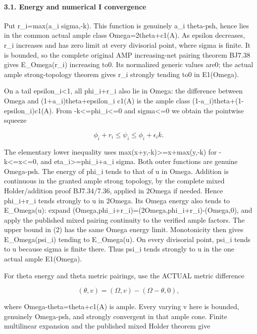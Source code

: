 \documentclass[
]{article}
\begin{document}
\paragraph{3.1. Energy and numerical I
convergence}\label{energy-and-numerical-i-convergence}

Put r\_i=max(a\_i sigma,-k). This function is genuinely a\_i theta-psh,
hence lies in the common actual ample class Omega=2theta+c1(A). As
epsilon decreases, r\_i increases and has zero limit at every divisorial
point, where sigma is finite. It is bounded, so the complete original
AMP increasing-net pairing theorem BJ7.38 gives E\_Omega(r\_i)
increasing to0. Its normalized generic values are0; the actual ample
strong-topology theorem gives r\_i strongly tending to0 in E1(Omega).

On a tail epsilon\_i\textless1, all phi\_i+r\_i also lie in Omega: the
difference between Omega and (1+a\_i)theta+epsilon\_i c1(A) is the ample
class (1-a\_i)theta+(1-epsilon\_i)c1(A). From
-k\textless=phi\_i\textless=0 and sigma\textless=0 we obtain the
pointwise squeeze

\[\phi_i+r_i\leq\psi_i\leq\phi_i+\epsilon_i k.\tag{2}\]

The elementary lower inequality uses max(x+y,-k)\textgreater=x+max(y,-k)
for -k\textless=x\textless=0, and eta\_i\textgreater=phi\_i+a\_i sigma.
Both outer functions are genuine Omega-psh. The energy of phi\_i tends
to that of u in Omega. Addition is continuous in the granted ample
strong topology, by the complete mixed Holder/addition proof
BJ7.34/7.36, applied in 2Omega if needed. Hence phi\_i+r\_i tends
strongly to u in 2Omega. Its Omega energy also tends to E\_Omega(u):
expand (Omega,phi\_i+r\_i)=(2Omega,phi\_i+r\_i)-(Omega,0), and apply the
published mixed pairing continuity to the verified ample factors. The
upper bound in (2) has the same Omega energy limit. Monotonicity then
gives E\_Omega(psi\_i) tending to E\_Omega(u). On every divisorial
point, psi\_i tends to u because sigma is finite there. Thus psi\_i
tends strongly to u in the one actual ample E1(Omega).

For theta energy and theta metric pairings, use the ACTUAL metric
difference

\[(\theta,v)=(\Omega,v)-(\Omega-\theta,0),\]

where Omega-theta=theta+c1(A) is ample. Every varying v here is bounded,
genuinely Omega-psh, and strongly convergent in that ample cone. Finite
multilinear expansion and the published mixed Holder theorem give
\end{document}
